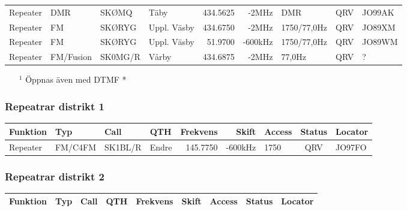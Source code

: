 \begin{landscape}
\begin{longtable}{llllrrlcl}
	Repeater           & DMR          & SKØMQ         & Täby         &          434.5625 &          -2MHz & DMR             &       QRV       & JO99AK           \\
	Repeater           & FM           & SKØRYG        & Uppl. Väsby  &          434.6750 &          -2MHz & 1750/77,0Hz     &       QRV       & JO89XM           \\
	Repeater           & FM           & SKØRYG        & Uppl. Väsby  &           51.9700 &        -600kHz & 1750/77,0Hz     &       QRV       & JO89WM           \\
	Repeater           & FM/Fusion    & SK0MG/R         & Vårby        &          434.6875 &          -2MHz & 77,0Hz          &       QRV       & ?
\end{longtable}
\begin{itemize}
	\item[$^1$] Öppnas även med DTMF *
\end{itemize}
\normalsize

\clearpage

\subsubsection{Repeatrar distrikt 1}
\footnotesize
\begin{longtable}{llllrrlcl}
\textbf{Funktion} & \textbf{Typ} & \textbf{Call} & \textbf{QTH} & \textbf{Frekvens} & \textbf{Skift} & \textbf{Access} & \textbf{Status} & \textbf{Locator} \\ \hline \endhead
Repeater          & FM/C4FM      & SK1BL/R       & Endre	& 145.7750          & -600kHz        & 1750            & QRV             & JO97FO           \\
\end{longtable}
\normalsize

\subsubsection{Repeatrar distrikt 2}
\footnotesize
\begin{longtable}{llllrrlcl}
\textbf{Funktion}                 & \textbf{Typ}  & \textbf{Call} & \textbf{QTH}        & \textbf{Frekvens} & \textbf{Skift} & \textbf{Access}  & \textbf{Status} & \textbf{Locator} \\ \hline \endhead


\end{longtable}
\end{landscape}
